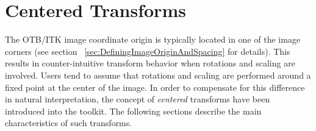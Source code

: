 

\section{Centered Transforms}

The OTB/ITK image coordinate origin is typically located in one of the image
corners (see section ~\ref{sec:DefiningImageOriginAndSpacing} for details).
This results in counter-intuitive transform behavior when rotations and scaling
are involved. Users tend to assume that rotations and scaling are performed
around a fixed point at the center of the image.  In order to compensate for
this difference in natural interpretation, the concept of \emph{centered}
transforms have been introduced into the toolkit. The following sections
describe the main characteristics of such transforms.




